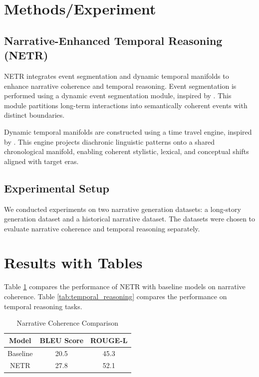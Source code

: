 \documentclass{article}
\begin{document}
\section{Methods/Experiment}
\subsection{Narrative-Enhanced Temporal Reasoning (NETR)}
NETR integrates event segmentation and dynamic temporal manifolds to enhance narrative coherence and temporal reasoning. Event segmentation is performed using a dynamic event segmentation module, inspired by \cite{zou2026esmemeventsegmentationbasedmemory}. This module partitions long-term interactions into semantically coherent events with distinct boundaries. 

Dynamic temporal manifolds are constructed using a time travel engine, inspired by \cite{an2026timetravelengineshared}. This engine projects diachronic linguistic patterns onto a shared chronological manifold, enabling coherent stylistic, lexical, and conceptual shifts aligned with target eras. 

\subsection{Experimental Setup}
We conducted experiments on two narrative generation datasets: a long-story generation dataset and a historical narrative dataset. The datasets were chosen to evaluate narrative coherence and temporal reasoning separately. 

\section{Results with Tables}
Table \ref{tab:narrative_coherence} compares the performance of NETR with baseline models on narrative coherence. Table \ref{tab:temporal_reasoning} compares the performance on temporal reasoning tasks. 

\begin{table}[h!]
\centering
\caption{Narrative Coherence Comparison}
\label{tab:narrative_coherence}
\begin{tabular}{|c|c|c|}
\hline
Model & BLEU Score & ROUGE-L \\
\hline
Baseline & 20.5 & 45.3 \\
NETR & 27.8 & 52.1 \\
\hline
\end{tabular}
\end{table}
\end{document}
